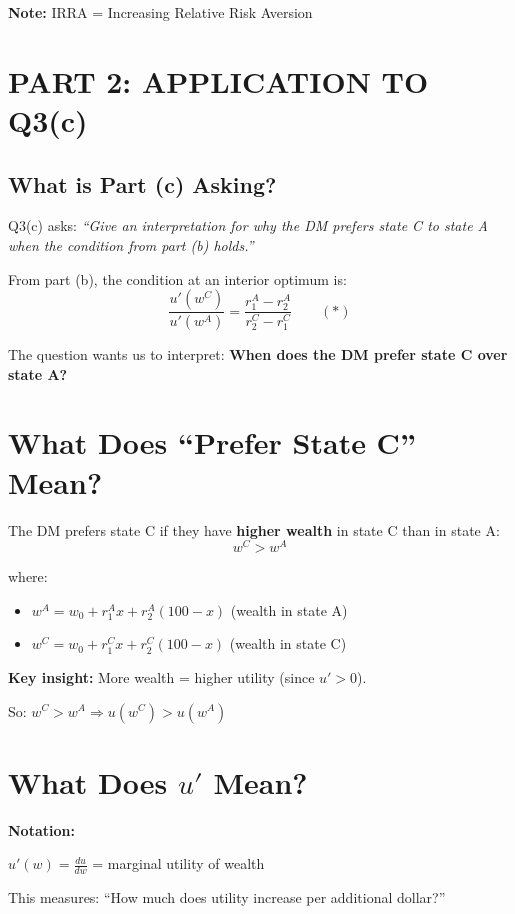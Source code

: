 \documentclass[12pt]{article}
\begin{document}
\textbf{Note:} IRRA = Increasing Relative Risk Aversion

\newpage

\section*{PART 2: APPLICATION TO Q3(c)}

\subsection*{What is Part (c) Asking?}

Q3(c) asks: \textit{``Give an interpretation for why the DM prefers state C to state A when the condition from part (b) holds.''}

From part (b), the condition at an interior optimum is:
$$\frac{u'(w^C)}{u'(w^A)} = \frac{r_1^A - r_2^A}{r_2^C - r_1^C} \qquad (*)$$

The question wants us to interpret: \textbf{When does the DM prefer state C over state A?}

\section*{What Does ``Prefer State C'' Mean?}

The DM prefers state C if they have \textbf{higher wealth} in state C than in state A:
$$w^C > w^A$$

where:
\begin{itemize}
    \item $w^A = w_0 + r_1^A x + r_2^A(100-x)$ (wealth in state A)
    \item $w^C = w_0 + r_1^C x + r_2^C(100-x)$ (wealth in state C)
\end{itemize}

\textbf{Key insight:} More wealth = higher utility (since $u' > 0$).

So: $w^C > w^A \Rightarrow u(w^C) > u(w^A)$

\section*{What Does $u'$ Mean?}

\begin{center}
\colorbox{blue!20}{
\begin{minipage}{0.9\textwidth}
\textbf{Notation:}

$u'(w) = \frac{du}{dw}$ = marginal utility of wealth

This measures: ``How much does utility increase per additional dollar?''
\end{minipage}
}
\end{center}
\end{document}
